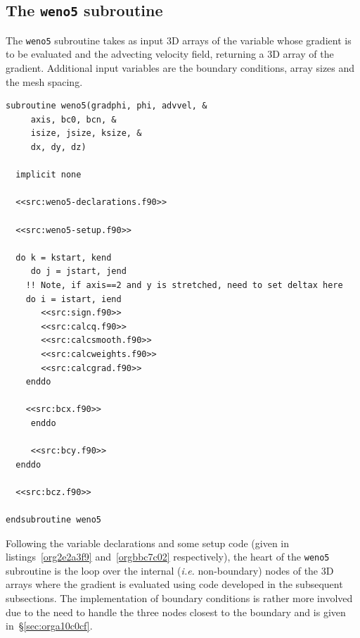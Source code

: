 \documentclass[11pt]{article}
\begin{document}
\subsection{The \texttt{weno5} subroutine}
\label{sec:org7acb819}

The \texttt{weno5} subroutine takes as input 3D arrays of the variable whose gradient is to be evaluated
and the advecting velocity field, returning a 3D array of the gradient.
Additional input variables are the boundary conditions, array sizes and the mesh spacing.

\begin{lstlisting}
subroutine weno5(gradphi, phi, advvel, &
     axis, bc0, bcn, &
     isize, jsize, ksize, &
     dx, dy, dz)

  implicit none

  <<src:weno5-declarations.f90>>

  <<src:weno5-setup.f90>>

  do k = kstart, kend
     do j = jstart, jend
	!! Note, if axis==2 and y is stretched, need to set deltax here
	do i = istart, iend
	   <<src:sign.f90>>
	   <<src:calcq.f90>>
	   <<src:calcsmooth.f90>>
	   <<src:calcweights.f90>>
	   <<src:calcgrad.f90>>
	enddo

	<<src:bcx.f90>>
     enddo

     <<src:bcy.f90>>
  enddo

  <<src:bcz.f90>>

endsubroutine weno5
\end{lstlisting}

Following the variable declarations and some setup code (given in
listings~\ref{org2e2a3f9} and~\ref{orgbbc7c02} respectively), the heart of the \texttt{weno5}
subroutine is the loop over the internal (\emph{i.e.} non-boundary) nodes of the 3D arrays where the
gradient is evaluated using code developed in the subsequent subsections.
The implementation of boundary conditions is rather more involved due to the need to handle the
three nodes closest to the boundary and is given in~\S\ref{sec:orga10c0cf}.
\end{document}
